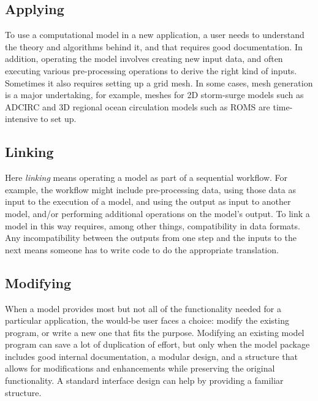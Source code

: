 \documentclass{article} %
\begin{document}
\subsection{Applying}

To use a computational model in a new application, a user needs to understand the theory and algorithms behind it, and that requires good documentation. In addition, operating the model involves creating new input data, and often executing various pre-processing operations to derive the right kind of inputs. Sometimes it also requires setting up a grid mesh. In some cases, mesh generation is a major undertaking, for example, meshes for 2D storm-surge models such as ADCIRC \citep{luettich1992adcirc} and 3D regional ocean circulation models such as ROMS \citep{shchepetkin2005regional} are time-intensive to set up.


\subsection{Linking}

Here \textit{linking} means operating a model as part of a sequential workflow. For example, the workflow might include pre-processing data, using those data as input to the execution of a model, and using the output as input to another model, and/or performing additional operations on the model's output. To link a model in this way requires, among other things, compatibility in data formats. Any incompatibility between the outputs from one step and the inputs to the next means someone has to write code to do the appropriate translation.

\subsection{Modifying}

When a model provides most but not all of the functionality needed for a particular application, the would-be user faces a choice: modify the existing program, or write a new one that fits the purpose. Modifying an existing model program can save a lot of duplication of effort, but only when the model package includes good internal documentation, a modular design, and a structure that allows for modifications and enhancements while preserving the original functionality. A standard interface design can help by providing a familiar structure.
\end{document}
